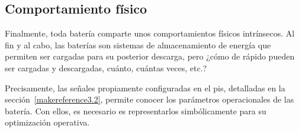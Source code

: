 \subsection{Comportamiento físico}%
\label{makereference5.1.5}

Finalmente, toda batería comparte unos comportamientos físicos intrínsecos. Al fin y al cabo, las baterías son sistemas de almacenamiento de energía que permiten ser cargadas para su posterior descarga, pero ¿cómo de rápido pueden ser cargadas y descargadas, cuánto, cuántas veces, etc.?

Precisamente, las señales propiamente configuradas en el \gls{pis}, detalladas en la sección~\ref{makereference3.2}, permite conocer los parámetros operacionales de las batería. Con ellos, es necesario es representarlos simbólicamente para su optimización operativa.

